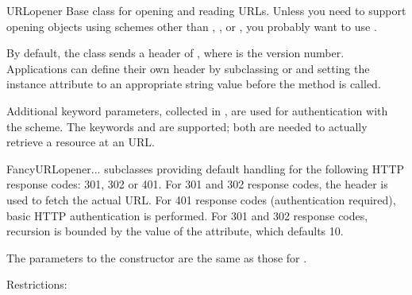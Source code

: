 \begin{classdesc}{URLopener}{}
Base class for opening and reading URLs.  Unless you need to support
opening objects using schemes other than , ,
 or , you probably want to use
.

By default, the  class sends a
 header of , where
 is the  version number.  Applications can
define their own  header by subclassing
 or  and setting the instance
attribute  to an appropriate string value before the
 method is called.

Additional keyword parameters, collected in , are used for
authentication with the  scheme.  The keywords
 and  are supported; both are needed to
actually retrieve a resource at an  URL.
\end{classdesc}

\begin{classdesc}{FancyURLopener}{...}
 subclasses  providing default
handling for the following HTTP response codes: 301, 302 or 401.  For
301 and 302 response codes, the  header is used to
fetch the actual URL.  For 401 response codes (authentication
required), basic HTTP authentication is performed.  For 301 and 302 response
codes, recursion is bounded by the value of the  attribute,
which defaults 10.

The parameters to the constructor are the same as those for
.

\end{classdesc}

Restrictions:


